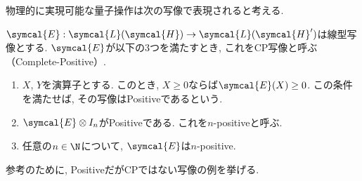 

物理的に実現可能な量子操作は次の写像で表現されると考える. 

\begin{mydfn}[CP写像]\label{dfn.CP-map}
  $\symcal{E}:\symcal{L}(\symcal{H})\to\symcal{L}(\symcal{H}')$は線型写像とする. 
  $\symcal{E}$が以下の3つを満たすとき, これをCP写像と呼ぶ（Complete-Positive）. 
  \begin{enumerate}
    \item $X$, $Y$を演算子とする. 
    このとき, $X\geq 0$ならば$\symcal{E}(X)\geq 0$. 
    この条件を満たせば, その写像はPositiveであるという. 
    \item $\symcal{E}\otimes I_n$がPositiveである. 
    これを$n$-positiveと呼ぶ. 
    \item 任意の$n\in \N$について, $\symcal{E}$は$n$-positive. 
  \end{enumerate}
\end{mydfn}

参考のために, PositiveだがCPではない写像の例を挙げる. 

